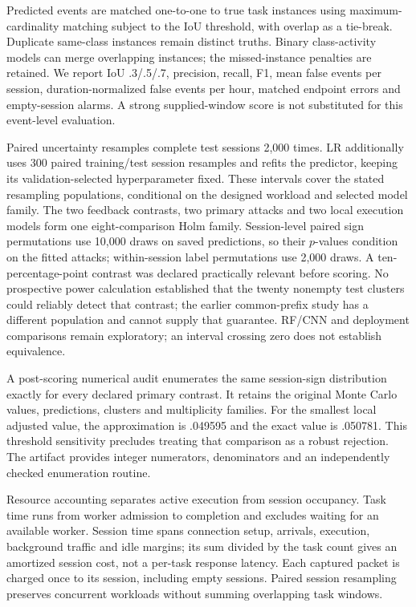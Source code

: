 Predicted events are matched one-to-one to true task instances using maximum-cardinality matching subject to the IoU threshold, with overlap as a tie-break. Duplicate same-class instances remain distinct truths. Binary class-activity models can merge overlapping instances; the missed-instance penalties are retained. We report IoU .3/.5/.7, precision, recall, F1, mean false events per session, duration-normalized false events per hour, matched endpoint errors and empty-session alarms. A strong supplied-window score is not substituted for this event-level evaluation.

Paired uncertainty resamples complete test sessions 2,000 times. LR additionally uses 300 paired training/test session resamples and refits the predictor, keeping its validation-selected hyperparameter fixed. These intervals cover the stated resampling populations, conditional on the designed workload and selected model family. The two feedback contrasts, two primary attacks and two local execution models form one eight-comparison Holm family. Session-level paired sign permutations use 10,000 draws on saved predictions, so their $p$-values condition on the fitted attacks; within-session label permutations use 2,000 draws. A ten-percentage-point contrast was declared practically relevant before scoring. No prospective power calculation established that the twenty nonempty test clusters could reliably detect that contrast; the earlier common-prefix study has a different population and cannot supply that guarantee. RF/CNN and deployment comparisons remain exploratory; an interval crossing zero does not establish equivalence.

A post-scoring numerical audit enumerates the same session-sign distribution exactly for every declared primary contrast. It retains the original Monte Carlo values, predictions, clusters and multiplicity families. For the smallest local adjusted value, the approximation is .049595 and the exact value is .050781. This threshold sensitivity precludes treating that comparison as a robust rejection. The artifact provides integer numerators, denominators and an independently checked enumeration routine.

Resource accounting separates active execution from session occupancy. Task time runs from worker admission to completion and excludes waiting for an available worker. Session time spans connection setup, arrivals, execution, background traffic and idle margins; its sum divided by the task count gives an amortized session cost, not a per-task response latency. Each captured packet is charged once to its session, including empty sessions. Paired session resampling preserves concurrent workloads without summing overlapping task windows.

